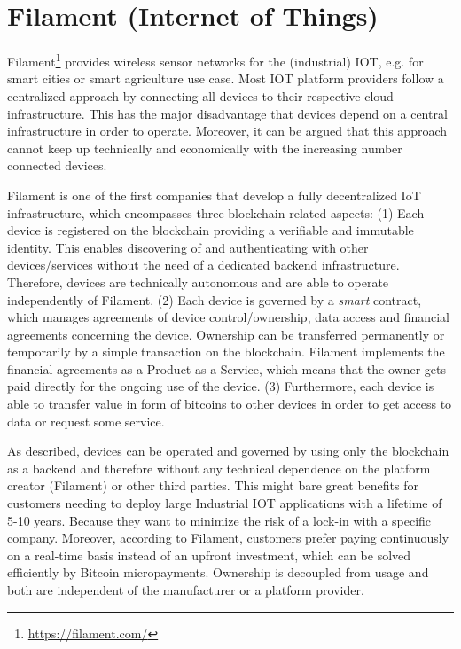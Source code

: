 \section{Filament (Internet of Things)}
\label{sec:ecofilament}

Filament\footnote{\url{https://filament.com/}} provides wireless sensor networks for the (industrial) \ac{IOT}, e.g. 
for smart cities or smart agriculture use case. Most \ac{IOT} platform providers follow 
a centralized approach by connecting all devices to their respective cloud-infrastructure. 
This has the major disadvantage that devices depend on a central infrastructure 
in order to operate. Moreover, it can be argued that this approach cannot keep 
up technically and economically with the increasing number connected devices.

Filament is one of the first companies that develop a fully decentralized IoT infrastructure, 
which encompasses three blockchain-related aspects: (1) Each device is registered 
on the blockchain providing a verifiable and immutable identity. This enables discovering 
of and authenticating with other devices/services without the need of a dedicated 
backend infrastructure. Therefore, devices are technically autonomous and are able 
to operate independently of Filament. (2) Each device is governed by a \emph{smart} 
contract, which manages agreements of device control/ownership, data access and 
financial agreements concerning the device. Ownership can be transferred permanently 
or temporarily by a simple transaction on the blockchain. Filament implements the 
financial agreements as a Product-as-a-Service, which means that the owner gets 
paid directly for the ongoing use of the device. (3) Furthermore, each device is 
able to transfer value in form of bitcoins to other devices in order to get access 
to data or request some service.

As described, devices can be operated and governed by using only the blockchain 
as a backend and therefore without any technical dependence on the platform creator 
(Filament) or other third parties. This might bare great benefits for customers 
needing to deploy large Industrial \ac{IOT} applications with a lifetime of 5-10 years. 
Because they want to minimize the risk of a lock-in with a specific company. Moreover, 
according to Filament, customers prefer paying continuously on a real-time basis 
instead of an upfront investment, which can be solved efficiently by Bitcoin micropayments. 
Ownership is decoupled from usage and both are independent of the manufacturer 
or a platform provider.

